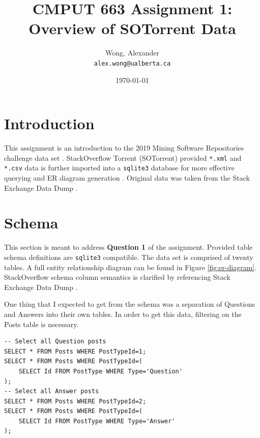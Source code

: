 \documentclass[a4paper,11pt, notitlepage]{report}
\author{
    Wong, Alexander\\
    \texttt{alex.wong@ualberta.ca}
}
\date{\today}
\title{CMPUT 663 Assignment 1: Overview of SOTorrent Data}
\theoremstyle{definition}
\numberwithin{equation}{section}		%
\begin{document}

\maketitle

\section{Introduction}
This assignment is an introduction to the 2019 Mining Software Repositories challenge data set \cite{DBLP:conf/msr/BaltesDT008}. StackOverflow Torrent (SOTorrent) provided \texttt{*.xml} and \texttt{*.csv} data is further imported into a \texttt{sqlite3} database for more effective querying and ER diagram generation \cite{wong_2019}. Original data was taken from the Stack Exchange Data Dump \cite{stackexchange}.

\section{Schema}

This section is meant to address \textbf{Question 1} of the assignment. Provided table schema definitions are \texttt{sqlite3} compatible. The data set is comprised of twenty tables. A full entity relationship diagram can be found in Figure \ref{fig:er-diagram}. StackOverflow schema column semantics is clarified by referencing Stack Exchange Data Dump \cite{se_schema_q}.

One thing that I expected to get from the schema was a separation of Questions and Answers into their own tables. In order to get this data, filtering on the Posts table is necessary.
\begin{lstlisting}
-- Select all Question posts
SELECT * FROM Posts WHERE PostTypeId=1;
SELECT * FROM Posts WHERE PostTypeId=(
    SELECT Id FROM PostType WHERE Type='Question'
);
-- Select all Answer posts
SELECT * FROM Posts WHERE PostTypeId=2;
SELECT * FROM Posts WHERE PostTypeId=(
    SELECT Id FROM PostType WHERE Type='Answer'
);
\end{lstlisting}
\end{document}
